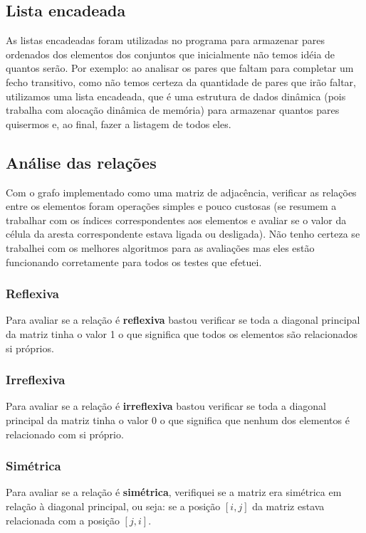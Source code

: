 \documentclass[12pt]{article}
\begin{document}
\subsection{Lista encadeada}

As listas encadeadas foram utilizadas no programa para armazenar pares ordenados dos 
elementos dos conjuntos que inicialmente não temos idéia de quantos serão.
Por exemplo: ao analisar os pares que faltam para completar um fecho transitivo, 
como não temos certeza da quantidade de pares que irão faltar, utilizamos uma
lista encadeada, que é uma estrutura de dados dinâmica (pois trabalha com alocação 
dinâmica de memória) para armazenar quantos pares quisermos e, ao final, fazer
a listagem de todos eles.

\subsection{Análise das relações}

Com o grafo implementado como uma matriz de adjacência, verificar as relações entre 
os elementos foram operações simples e pouco custosas (se resumem a trabalhar
com os índices correspondentes aos elementos e avaliar se o valor da célula da aresta 
correspondente estava ligada ou desligada). Não tenho certeza se trabalhei
com os melhores algoritmos para as avaliações mas eles estão funcionando corretamente 
para todos os testes que efetuei.

\subsubsection{Reflexiva}
Para avaliar se a relação é \textbf{reflexiva} bastou verificar se toda a
diagonal principal da matriz tinha o valor 1 o que significa que todos os
elementos são relacionados si próprios.

\subsubsection{Irreflexiva}
Para avaliar se a relação é \textbf{irreflexiva} bastou verificar se toda a
diagonal principal da matriz tinha o valor 0 o que significa que nenhum dos
elementos é relacionado com si próprio.

\subsubsection{Simétrica}
Para avaliar se a relação é \textbf{simétrica}, verifiquei se a matriz era
simétrica em relação à diagonal principal, ou seja: se a posição
$[i,j]$ da matriz estava relacionada com a posição $[j,i]$.
\end{document}
